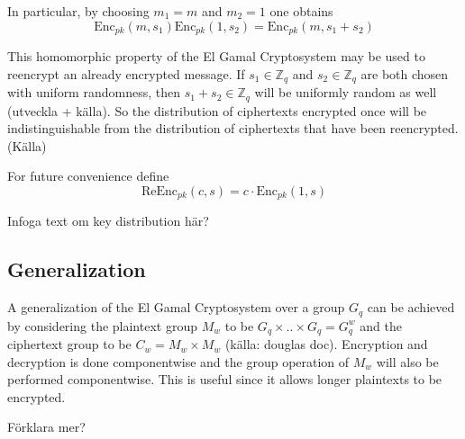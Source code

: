 In particular, by choosing $m_1 = m$ and $m_2 = 1$ one obtains
$$
\mathrm{Enc}_{pk}(m, s_1) \mathrm{Enc}_{pk}(1, s_2) = \mathrm{Enc}_{pk}(m, s_1 + s_2)
$$

This homomorphic property of the El Gamal Cryptosystem may be used to
reencrypt an already encrypted message. If $s_1 \in \mathbb{Z}_q$ and
$s_2 \in \mathbb{Z}_q$ are both chosen with uniform randomness, then
$s_1 + s_2 \in \mathbb{Z}_q$ will be uniformly random as well
(utveckla + källa). So the distribution of ciphertexts encrypted once
will be indistinguishable from the distribution of ciphertexts that
have been reencrypted. (Källa)

For future convenience define
$$
\mathrm{ReEnc}_{pk}(c,s) = c \cdot \mathrm{Enc}_{pk}(1,s) 
$$

Infoga text om key distribution här?


\subsection{Generalization}
A generalization of the El Gamal Cryptosystem over a group $G_q$ can
be achieved by considering the plaintext group $M_w$ to be $G_q \times
.. \times G_q = G_q^w$ and the ciphertext group to be $C_w = M_w
\times M_w$ (källa: douglas doc). Encryption and decryption is done
componentwise and the group operation of $M_w$ will also be performed
componentwise. This is useful since it allows longer plaintexts to be
encrypted.
 
Förklara mer?
